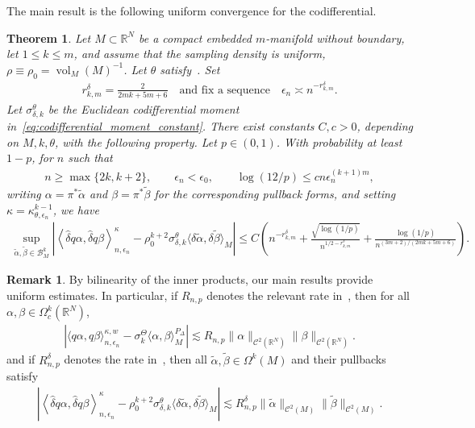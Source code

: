 \documentclass[11pt,reqno]{amsproc}
\numberwithin{equation}{section}
\newcommand{\R}{\mathbb{R}}
\newcommand{\cB}{\mathcal{B}}
\newcommand{\cC}{\mathcal{C}}
\newcommand{\talpha}{\tilde{\alpha}}
\newcommand{\hdelta}{\hat{\delta}}
\newcommand{\ls}{\lesssim}
\newcommand{\vol}{\operatorname{vol}}
\newtheorem{theorem}[counter]{Theorem}
\theoremstyle{definition}
\newtheorem{remark}[counter]{Remark}
\theoremstyle{plain}
\begin{document}
    The main result is the following uniform convergence for the codifferential.

    \begin{theorem} \label{thm:main_codiff}
        Let $M\subset\R^N$ be a compact embedded $m$-manifold without boundary, let $1\leq k\leq m$, and assume that the sampling density is uniform, $\rho\equiv \rho_0=\vol_M(M)^{-1}$. Let $\theta$ satisfy~. Set
        \begin{align}
            r^\delta_{k,m}=\frac{2}{2mk+5m+6}
            \quad \text{and fix a sequence} \quad 
            \epsilon_n\asymp n^{-r^\delta_{k,m}}.
        \end{align}
        Let $\sigma^\theta_{\delta,k}$ be the Euclidean codifferential moment in~\eqref{eq:codifferential_moment_constant}.
        There exist constants $C,c > 0$, depending on $M, k, \theta$, with the following property. Let $p\in(0,1)$. With probability at least $1-p$, for $n$ such that
        \begin{align}
            n\geq\max\{2k,k+2\},\qquad
            \epsilon_n<\epsilon_0,\qquad
            \log(12/p)\leq cn\epsilon_n^{(k+1)m},
        \end{align}
        writing $\alpha = \pi^* \talpha$ and $\beta = \pi^* \tilde{\beta}$ for the corresponding pullback forms, and setting $\kappa = \kappa^{k-1}_{\theta, \epsilon_n}$, we have
        \begin{align}
            \sup_{\tilde\alpha,\tilde\beta\in\cB_M^k}
            \left|\left\langle \hdelta q\alpha,\hdelta q\beta\right\rangle^{\kappa}_{n,\epsilon_n}-\rho_0^{k+2}\sigma^\theta_{\delta,k}\langle\delta\tilde\alpha,\delta\tilde\beta\rangle_M\right| \leq C\left(n^{-r^\delta_{k,m}}+\frac{\sqrt{\log(1/p)}}{n^{1/2-r^\delta_{k,m}}}+\frac{\log(1/p)}{n^{(3m+2)/(2mk+5m+6)}}\right).
        \end{align}
    \end{theorem}

    \begin{remark}
        By bilinearity of the inner products, our main results provide uniform estimates. In particular, if $R_{n,p}$ denotes the relevant rate in~, then for all $\alpha,\beta\in\Omega^k_c(\R^N)$,
        \begin{align}
            |\langle q\alpha,q\beta\rangle^{\kappa,w}_{n,\epsilon_n}-\sigma^\Theta_k\langle\alpha,\beta\rangle_M^{P_\Delta}|
            \ls R_{n,p}\|\alpha\|_{\cC^2(\R^N)}\|\beta\|_{\cC^2(\R^N)}.
        \end{align}
        and if $R^\delta_{n,p}$ denotes the rate in~, then all $\tilde\alpha,\tilde\beta\in\Omega^k(M)$ and their pullbacks satisfy
        \begin{align}
            \left|\left\langle\hdelta q\alpha,\hdelta q\beta\right\rangle^\kappa_{n,\epsilon_n}
            -\rho_0^{k+2}\sigma^\theta_{\delta,k}\langle\delta\tilde\alpha,\delta\tilde\beta\rangle_M\right|
            \ls R^\delta_{n,p}\|\tilde\alpha\|_{\cC^2(M)}\|\tilde\beta\|_{\cC^2(M)}.
        \end{align}
    \end{remark}
\end{document}
